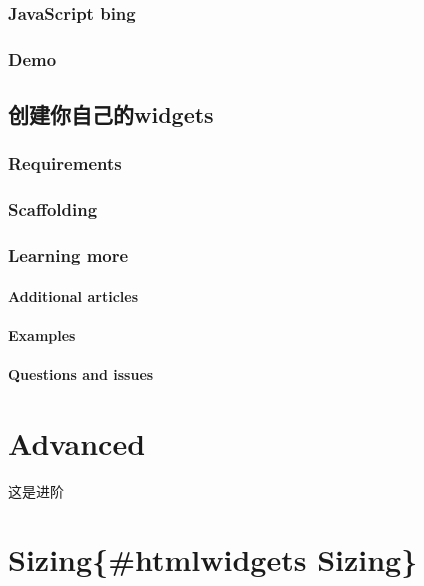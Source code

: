 \documentclass[]{book}
\theoremstyle{definition}
\theoremstyle{definition}
\theoremstyle{definition}
\theoremstyle{remark}
\begin{document}
\subsection{JavaScript bing}\label{javascript-bing}

\subsection{Demo}\label{demo}

\section{创建你自己的widgets}\label{widgets}

\subsection{Requirements}\label{requirements}

\subsection{Scaffolding}\label{scaffolding}

\subsection{Learning more}\label{learning-more}

\subsubsection{Additional articles}\label{additional-articles}

\subsubsection{Examples}\label{examples}

\subsubsection{Questions and issues}\label{questions-and-issues}

\chapter{Advanced}\label{htmlwidgetsux8fdbux9636}

这是进阶

\chapter{Sizing\{\#htmlwidgets Sizing\}}\label{sizinghtmlwidgets-sizing}
\end{document}

